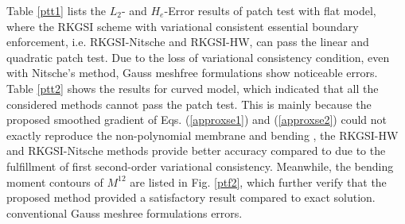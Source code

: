 Table \ref{ptt1} lists the $L_2$- and $H_e$-Error results of patch test with flat model, where the RKGSI scheme with variational consistent essential boundary enforcement, i.e. RKGSI-Nitsche and RKGSI-HW, can pass the linear and quadratic patch test. \DIFaddbegin {}\DIFaddend Due to the loss of variational consistency condition, even with \DIFaddbegin {}\DIFaddend Nitsche's method, Gauss meshfree formulations show noticeable errors. Table \ref{ptt2} shows the results for curved model, which indicated that all the considered methods cannot pass the patch test. This is mainly because the proposed smoothed gradient of Eqs. (\ref{approxse1}) and (\ref{approxse2}) could not exactly reproduce the non-polynomial membrane and bending \DIFdelbegin {}\DIFdelend \DIFaddbegin {}\DIFaddend , the RKGSI-HW and RKGSI-Nitsche methods \DIFdelbegin {}\DIFdelend provide better accuracy compared to \DIFdelbegin {}\DIFdelend \DIFaddbegin {}\DIFaddend due to the fulfillment of first second-order variational consistency. \DIFaddbegin {}\DIFaddend Meanwhile, the bending moment contours of $M^{12}$ are listed in Fig. \ref{ptf2}, which further verify that the proposed method provided a satisfactory result compared to \DIFaddbegin {}\DIFaddend exact solution. \DIFdelbegin {}\DIFdelend \DIFaddbegin {}\DIFaddend conventional Gauss meshree formulations \DIFdelbegin {}\DIFdelend \DIFaddbegin {}\DIFaddend errors.

